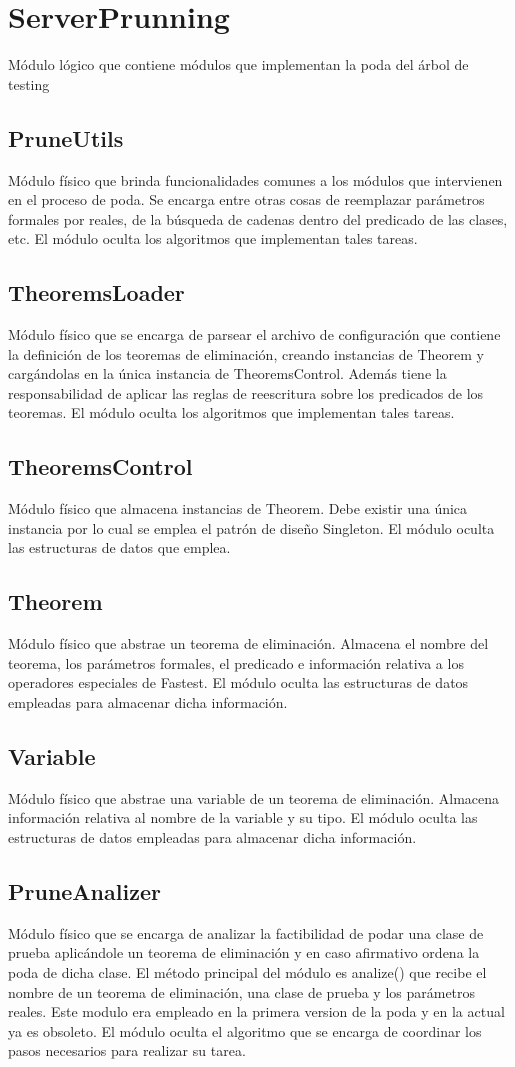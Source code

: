 \documentclass[a4paper,10pt]{report}
\begin{document}
	\section{ServerPrunning}
	Módulo lógico que contiene módulos que implementan la poda del árbol de testing
		\subsection{PruneUtils}
		Módulo físico que brinda funcionalidades comunes a los módulos que intervienen en el proceso de poda. Se encarga entre otras cosas de reemplazar parámetros formales por reales, de la búsqueda de cadenas dentro del predicado de las clases, etc. El módulo oculta los algoritmos que implementan tales tareas.
		\subsection{TheoremsLoader}
		Módulo físico que se encarga de parsear el archivo de configuración que contiene la definición de los teoremas de eliminación, creando instancias de Theorem y cargándolas en la única instancia de TheoremsControl. Además tiene la responsabilidad de aplicar las reglas de reescritura sobre los predicados de los teoremas. El módulo oculta los algoritmos que implementan tales tareas. 
		\subsection{TheoremsControl}
		Módulo físico que almacena instancias de Theorem. Debe existir una única instancia por lo cual se emplea el patrón de diseño Singleton. El módulo oculta las estructuras de datos que emplea.
		\subsection{Theorem}
		Módulo físico que abstrae un teorema de eliminación. Almacena el nombre del teorema, los parámetros formales, el predicado e información relativa a los operadores especiales de Fastest.
		El módulo oculta las estructuras de datos empleadas para almacenar dicha información.
		\subsection{Variable}
		Módulo físico que abstrae una variable de un teorema de eliminación. Almacena información relativa al nombre de la variable y su tipo. El módulo oculta las estructuras de datos empleadas para almacenar dicha información.
		\subsection{PruneAnalizer}
		Módulo físico que se encarga de analizar la factibilidad de podar una clase de prueba aplicándole un teorema de eliminación y en caso afirmativo ordena la poda de dicha clase. El método principal del módulo es analize() que recibe el nombre de un teorema de eliminación, una clase de prueba y los parámetros reales. Este modulo era empleado en la primera version de la poda y en la actual ya es obsoleto.
		El módulo oculta el algoritmo que se encarga de coordinar los pasos necesarios para realizar su tarea.
\end{document}
